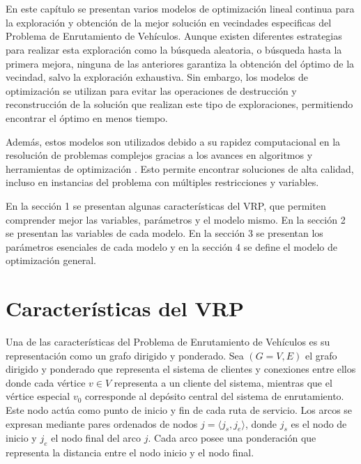 \documentclass{article}
\begin{document}
\section {}
En este capítulo se presentan varios modelos de optimización lineal continua para la exploración y obtención de la mejor solución en vecindades especificas del Problema de Enrutamiento de Vehículos. Aunque existen diferentes estrategias para realizar esta exploración como la búsqueda aleatoria, o búsqueda hasta la primera mejora, ninguna de las anteriores garantiza la obtención del óptimo de la vecindad, salvo la exploración exhaustiva. Sin embargo, los modelos de optimización se utilizan para evitar las operaciones de destrucción y reconstrucción de la solución que realizan este tipo de exploraciones, permitiendo encontrar el óptimo en menos tiempo.

Además, estos modelos son utilizados debido a su rapidez computacional en la resolución de problemas complejos gracias a los avances en algoritmos y herramientas de optimización \cite{ref24}. Esto permite encontrar soluciones de alta calidad, incluso en instancias del problema con múltiples restricciones y variables. 


En la sección 1 se presentan algunas características del VRP, que permiten comprender mejor las variables, parámetros y el modelo mismo. En la sección  2 se presentan las variables de cada modelo. En la sección 3 se presentan los parámetros esenciales de cada modelo y en la sección 4 se define el modelo de optimización general.

\section {Características del VRP}

Una de las características del Problema de Enrutamiento de Vehículos es su representación como un grafo dirigido y ponderado.  Sea $(G=V,E)$ el grafo dirigido y ponderado que representa el sistema de clientes y conexiones entre ellos donde cada vértice $v \in V$ representa a un cliente del sistema, mientras que el vértice especial $v_0$ corresponde al depósito central del sistema de enrutamiento. Este nodo actúa como punto de inicio y fin de cada ruta de servicio. Los arcos se expresan mediante pares ordenados de nodos $j = \langle j_s, j_e \rangle$, donde $j_s$ es el nodo de inicio y $j_e$ el nodo final del arco $j$. Cada arco posee una ponderación que representa la distancia entre el nodo inicio y el nodo final.
\end{document}
